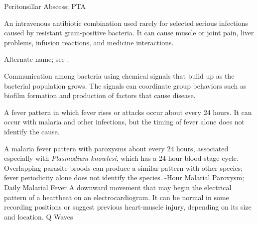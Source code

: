 \synonyms
Peritonsillar Abscess; PTA

 An intravenous antibiotic combination used rarely for selected serious infections caused by resistant gram-positive bacteria. It can cause muscle or joint pain, liver problems, infusion reactions, and medicine interactions.

 Alternate name; see .

 Communication among bacteria using chemical signals that build up as the bacterial population grows. The signals can coordinate group behaviors such as biofilm formation and production of factors that cause disease.

 A fever pattern in which fever rises or attacks occur about every 24 hours. It can occur with malaria and other infections, but the timing of fever alone does not identify the cause.

 A malaria fever pattern with paroxysms about every 24 hours, associated especially with \textit{Plasmodium knowlesi}, which has a 24-hour blood-stage cycle. Overlapping parasite broods can produce a similar pattern with other species; fever periodicity alone does not identify the species.
-Hour Malarial Paroxysm; Daily Malarial Fever
 A downward movement that may begin the electrical pattern of a heartbeat on an electrocardiogram. It can be normal in some recording positions or suggest previous heart-muscle injury, depending on its size and location.
\synonyms
Q Waves
